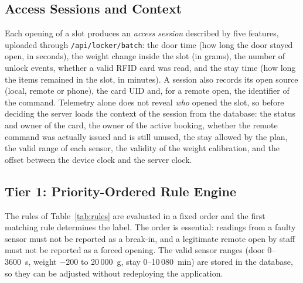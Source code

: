 \subsection{Access Sessions and Context}\label{sec:sessions}

Each opening of a slot produces an \emph{access session} described by five features, uploaded through
\texttt{/api/locker/batch}: the door time (how long the door stayed open, in seconds), the weight change inside the
slot (in grams), the number of unlock events, whether a valid RFID card was read, and the stay time (how long the items
remained in the slot, in minutes). A session also records its open source (local, remote or phone), the card UID and,
for a remote open, the identifier of the command. Telemetry alone does not reveal \emph{who} opened the slot, so before
deciding the server loads the context of the session from the database: the status and owner of the card, the owner of
the active booking, whether the remote command was actually issued and is still unused, the stay allowed by the plan,
the valid range of each sensor, the validity of the weight calibration, and the offset between the device clock and
the server clock.

\subsection{Tier 1: Priority-Ordered Rule Engine}

The rules of Table~\ref{tab:rules} are evaluated in a fixed order and the first matching rule determines the label.
The order is essential: readings from a faulty sensor must not be reported as a break-in, and a legitimate remote open
by staff must not be reported as a forced opening. The valid sensor ranges (door 0--3600~s, weight $-200$ to
20\,000~g, stay 0--10\,080~min) are stored in the database, so they can be adjusted without redeploying the
application.

